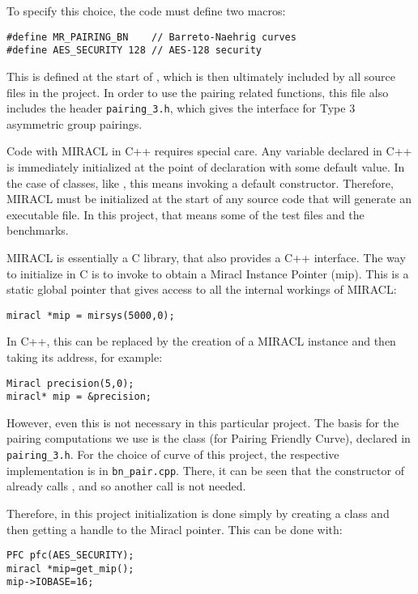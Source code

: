 \documentclass{article}
\begin{document}
To specify this choice, the code must define two macros:
\begin{verbatim}
#define MR_PAIRING_BN    // Barreto-Naehrig curves
#define AES_SECURITY 128 // AES-128 security
\end{verbatim}

This is defined at the start of \fhutils, which is then ultimately included by all source files in the project.
In order to use the pairing related functions, this file also includes the header \verb|pairing_3.h|, which gives the interface for Type 3 asymmetric group pairings.

Code with MIRACL in C++ requires special care. Any variable declared in C++ is immediately initialized at the point of declaration with some default value. In the case of classes, like \cBig, this means invoking a default constructor. Therefore, MIRACL must be initialized at the start of any source code that will generate an executable file. In this project, that means some of the test files and the benchmarks.

MIRACL is essentially a C library, that also provides a C++ interface. The way to initialize in C is to invoke  to obtain a Miracl Instance Pointer (mip). This is a static global pointer that gives access to all the internal workings of MIRACL:
\begin{verbatim}
miracl *mip = mirsys(5000,0);
\end{verbatim}

In C++, this can be replaced by the creation of a MIRACL instance and then taking its address, for example:
\begin{verbatim}
Miracl precision(5,0); 
miracl* mip = &precision;
\end{verbatim}

However, even this is not necessary in this particular project. The basis for the pairing computations we use is the class  (for Pairing Friendly Curve), declared in \verb|pairing_3.h|. For the choice of curve of this project, the respective implementation is in \verb|bn_pair.cpp|. There, it can be seen that the constructor of  already calls , and so another call is not needed. 

Therefore, in this project initialization is done simply by creating a  class and then getting a handle to the Miracl pointer. This can be done with:
\begin{verbatim}
PFC pfc(AES_SECURITY);  
miracl *mip=get_mip();  
mip->IOBASE=16;
\end{verbatim}
\end{document}
